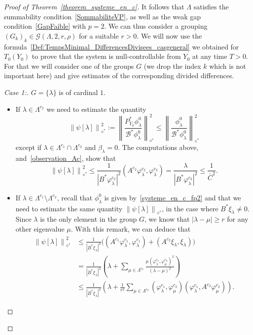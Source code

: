 \documentclass[10pt]{amsart}
\theoremstyle{definition}\newtheorem{defi}[theo]{Definition}\newtheorem{rema}[theo]{Remark}\newtheorem{exam}[theo]{Example}\newtheorem{exem}[theo]{Example}\newtheorem{nota}[theo]{Notation}
\newenvironment{step}[1]{\begin{proof}[#1]}{\let\qed\relax\end{proof}}
\newcommand{\fprop}[2]{\varphi^{#1}_{#2}}
\newcommand\Bs{\mathcal{B}^*}
\newcommand{\Fzp}{Y_0}
\newcommand{\normeXalphas}[1]{\left\| #1 \right\|_{\diamond^*}}
\newcommand{\PFa}{P_{\Fzp}^*}
\begin{document}
\begin{proof}[Proof of Theorem~\ref{theorem_systeme_en_c}]
It follows that $\Lambda$ satisfies the summability condition~\eqref{SommabiliteVP}, as well as the weak gap condition~\eqref{GapFaible} with $p=2$. We can thus consider a grouping $(G_k)_k\in \mathcal{G}(\Lambda,2,r,\rho)$ for a suitable $r>0$. We will now use the formula~\eqref{Def:TempsMinimal_DifferencesDivisees_casgeneral} we obtained for $T_0(\Fzp)$ to prove that the system is null-controllable from $\Fzp$ at any time $T>0$. For that we will consider one of the groups $G$ (we drop the index $k$ which is not important here) and give estimates of the corresponding divided differences.
\begin{step}{Case 1:} $G=\{\lambda\}$ is of cardinal $1$.
\begin{itemize}
\item If $\lambda\in \Lambda^{c_2}$ we need to estimate the quantity
\[
\normeXalphas{\psi[\lambda]}^2:=\normeXalphas{\frac{\PFa \phi_\lambda^0}{\Bs \phi_\lambda^0}}^2\leq \normeXalphas{\frac{\phi_\lambda^0}{\Bs \phi_\lambda^0}}^2
\]
except if $\lambda\in \Lambda^{c_1}\cap \Lambda^{c_2}$ and $\beta_\lambda=0$. The computations above, and~\eqref{observation_Ac}, show that
\[
\normeXalphas{\psi[\lambda]}^2\leq \frac{1}{|B^* \fprop{c_2}{\lambda}|^2} (A^{c_2} \fprop{c_2}{\lambda},\fprop{c_2}{\lambda}) = \frac{\lambda}{|B^* \fprop{c_2}{\lambda}|^2} \leq \frac{1}{\bar{C}^2}.
\]
\item If $\lambda\in \Lambda^{c_1}\setminus \Lambda^{c_2}$, recall that $\phi_\lambda^0$ is given by~\eqref{systeme_en_c_fp2} and that we need to estimate the same quantity $\normeXalphas{\psi[\lambda]}$, in the case where $B^*\xi_\lambda\neq 0$. Since $\lambda$ is the only element in the group $G$, we know that $|\lambda-\mu|\geq r$ for any other eigenvalue $\mu$. With this remark, we can deduce that
\begin{align*}
\normeXalphas{\psi[\lambda]}^2 & \leq \frac{1}{|B^* \xi_\lambda|^2} \big((A^{c_1}\fprop{c_1}{\lambda},\fprop{c_1}{\lambda}) + (A^{c_2} \xi_\lambda,\xi_\lambda) \big)\\
& = \frac{1}{|B^* \xi_\lambda|^2} \left(\lambda + \sum_{\mu\in \Lambda^{c_2}} \frac{\mu(\fprop{c_1}{\lambda},\fprop{c_2}{\mu})^2}{(\lambda-\mu)^2} \right) \\
& \leq \frac{1}{|B^* \xi_\lambda|^2} \left(\lambda + \frac{1}{r^2}\sum_{\mu\in \Lambda^{c_2}} (\fprop{c_1}{\lambda},\fprop{c_2}{\mu}) (\fprop{c_1}{\lambda},A^{c_2} \fprop{c_2}{\mu}) \right).
\end{align*}



\end{itemize}
\end{step}
\end{proof}
\end{document}
